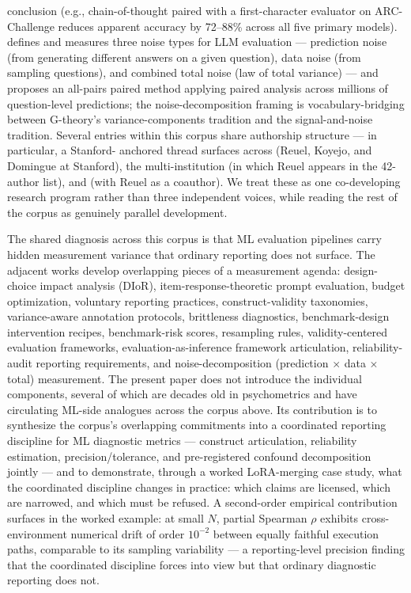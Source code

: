 \documentclass[10pt]{article}
\begin{document}
conclusion (e.g., chain-of-thought paired with a first-character
evaluator on ARC-Challenge reduces apparent accuracy by 72--88\%
across all five primary models). \citet{wang2025measuringnoises}
defines and measures three noise types for LLM evaluation ---
prediction noise (from generating different answers on a given
question), data noise (from sampling questions), and combined total
noise (law of total variance) --- and proposes an all-pairs paired
method applying paired analysis across millions of question-level
predictions; the noise-decomposition framing is vocabulary-bridging
between G-theory's variance-components tradition and the
signal-and-noise tradition. Several entries within this
corpus share authorship structure --- in particular, a Stanford-
anchored thread surfaces across \citet{salaudeen2025measurement}
(Reuel, Koyejo, and Domingue at Stanford), the multi-institution
\citet{bean2025measuring} (in which Reuel appears in the 42-author
list), and \citet{mcgregor2025benchrisk} (with Reuel as a coauthor).
We treat these as one co-developing research program rather than
three independent voices, while reading the rest of the corpus as
genuinely parallel development.

The shared diagnosis across this corpus is that ML evaluation
pipelines carry hidden measurement variance that ordinary
reporting does not surface. The adjacent works develop overlapping
pieces of a measurement agenda: design-choice impact analysis
(DIoR), item-response-theoretic prompt evaluation, budget
optimization, voluntary reporting practices, construct-validity
taxonomies, variance-aware annotation protocols, brittleness
diagnostics, benchmark-design intervention recipes, benchmark-risk
scores, resampling rules, validity-centered evaluation frameworks,
evaluation-as-inference framework articulation, reliability-audit
reporting requirements, and noise-decomposition
(prediction $\times$ data $\times$ total) measurement. The present
paper does not introduce
the individual components, several of which are decades old in
psychometrics and have circulating ML-side analogues across the
corpus above. Its contribution is to synthesize the corpus's
overlapping commitments into a coordinated reporting discipline
for ML diagnostic metrics --- construct articulation, reliability
estimation, precision/tolerance, and pre-registered confound
decomposition jointly --- and to demonstrate, through a worked
LoRA-merging case study, what the coordinated discipline changes
in practice: which claims are licensed, which are narrowed, and
which must be refused. A second-order empirical contribution
surfaces in the worked example: at small $N$, partial Spearman
$\rho$ exhibits cross-environment numerical drift of order
$10^{-2}$ between equally faithful execution paths, comparable
to its sampling variability --- a reporting-level precision
finding that the coordinated discipline forces into view but
that ordinary diagnostic reporting does not.
\end{document}
